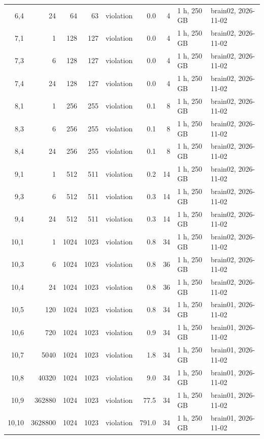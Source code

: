 \documentclass[10pt]{article}
\begin{document}
\begin{longtable}{@{}rrrrlrrll@{}}
\color{blue} 6,4 & 24 & 64 & 63 & violation & 0.0 & 4 & 1 h, 250 GB & brain02, 2026-11-02 \\
\color{blue} 7,1 & 1 & 128 & 127 & violation & 0.0 & 4 & 1 h, 250 GB & brain02, 2026-11-02 \\
\color{blue} 7,3 & 6 & 128 & 127 & violation & 0.0 & 4 & 1 h, 250 GB & brain02, 2026-11-02 \\
\color{blue} 7,4 & 24 & 128 & 127 & violation & 0.0 & 4 & 1 h, 250 GB & brain02, 2026-11-02 \\
\color{blue} 8,1 & 1 & 256 & 255 & violation & 0.1 & 8 & 1 h, 250 GB & brain02, 2026-11-02 \\
\color{blue} 8,3 & 6 & 256 & 255 & violation & 0.1 & 8 & 1 h, 250 GB & brain02, 2026-11-02 \\
\color{blue} 8,4 & 24 & 256 & 255 & violation & 0.1 & 8 & 1 h, 250 GB & brain02, 2026-11-02 \\
\color{blue} 9,1 & 1 & 512 & 511 & violation & 0.2 & 14 & 1 h, 250 GB & brain02, 2026-11-02 \\
\color{blue} 9,3 & 6 & 512 & 511 & violation & 0.3 & 14 & 1 h, 250 GB & brain02, 2026-11-02 \\
\color{blue} 9,4 & 24 & 512 & 511 & violation & 0.3 & 14 & 1 h, 250 GB & brain02, 2026-11-02 \\
\color{blue} 10,1 & 1 & 1024 & 1023 & violation & 0.8 & 34 & 1 h, 250 GB & brain02, 2026-11-02 \\
\color{blue} 10,3 & 6 & 1024 & 1023 & violation & 0.8 & 36 & 1 h, 250 GB & brain02, 2026-11-02 \\
\color{blue} 10,4 & 24 & 1024 & 1023 & violation & 0.8 & 36 & 1 h, 250 GB & brain02, 2026-11-02 \\
\color{blue} 10,5 & 120 & 1024 & 1023 & violation & 0.8 & 34 & 1 h, 250 GB & brain01, 2026-11-02 \\
\color{blue} 10,6 & 720 & 1024 & 1023 & violation & 0.9 & 34 & 1 h, 250 GB & brain01, 2026-11-02 \\
\color{blue} 10,7 & 5040 & 1024 & 1023 & violation & 1.8 & 34 & 1 h, 250 GB & brain01, 2026-11-02 \\
\color{blue} 10,8 & 40320 & 1024 & 1023 & violation & 9.0 & 34 & 1 h, 250 GB & brain01, 2026-11-02 \\
\color{blue} 10,9 & 362880 & 1024 & 1023 & violation & 77.5 & 34 & 1 h, 250 GB & brain01, 2026-11-02 \\
\color{blue} 10,10 & 3628800 & 1024 & 1023 & violation & 791.0 & 34 & 1 h, 250 GB & brain01, 2026-11-02 \\
\bottomrule
\end{longtable}
\end{document}
